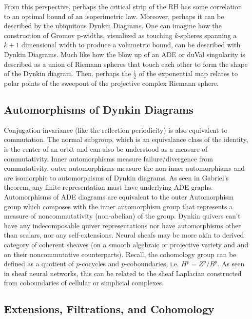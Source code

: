 \documentclass{article}
\theoremstyle{definition}
\begin{document}
From this perspective, perhaps the critical strip of the RH has some correlation to an optimal bound of an isoperimetric law. Moreover, perhaps it can be described by the ubiquitous Dynkin Diagrams. One can imagine how the construction of Gromov p-widths, visualized as touching $k$-spheres spanning a $k+1$ dimensional width to produce a volumetric bound, can be described with Dynkin Diagrams. Much like how the blow up of an ADE or duVal singularity is described as a union of Riemann spheres that touch each other to form the shape of the Dynkin diagram. Then, perhaps the $\frac{1}{2}$ of the exponential map relates to polar points of the sweepout of the projective complex Riemann sphere.

\subsection{Automorphisms of Dynkin Diagrams}
\label{sec:automorphisms}

Conjugation invariance (like the reflection periodicity) is also equivalent to commutation.
The normal subgroup, which is an equivalance class of the identity, is the center of an orbit and can also be understood as a measure of commutativity.
Inner automorphisms measure failure/divergence from commutativity, outer automorphisms measure the non-inner automorphisms and are isomorphic to automorphisms of Dynkin diagrams.
As seen in Gabriel's theorem, any finite representation must have underlying ADE graphs. 
Automorphisms of ADE diagrams are equivalent to the outer Automorphism group which composes with the inner automorphism group that represents a measure of noncommutativity (non-abelian) of the group.  
Dynkin quivers can't have any indecomposable quiver representations nor have automorphisms other than scalars, nor any self-extensions. Neural sheafs may be more akin to derived category of coherent sheaves (on a smooth algebraic or projective variety and and on their noncommutative counterparts). 
Recall, the cohomology group can be defined as a quotient of $p$-cocycles and $p$-coboundaries, i.e. $H^p = Z^p / B^p$. 
As seen in sheaf neural networks, this can be related to the sheaf Laplacian constructed from coboundaries of cellular or simplicial complexes. 







\subsection{Extensions, Filtrations, and Cohomology}
\label{sec:extensions}
\end{document}
